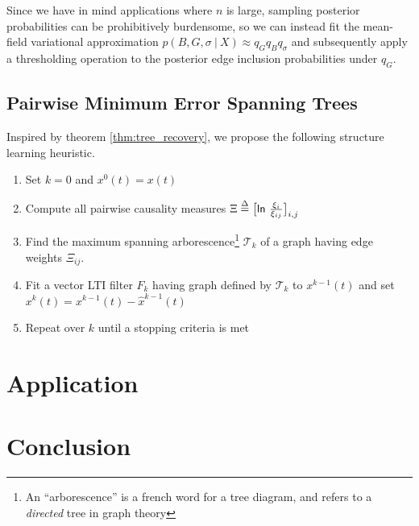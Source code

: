 \documentclass[12pt]{article}
\begin{document}
Since we have in mind applications where $n$ is large, sampling posterior probabilities can be prohibitively burdensome, so we can instead fit the mean-field variational approximation $p(B, G, \sigma\ |\ X) \approx q_Gq_Bq_\sigma$ and subsequently apply a thresholding operation to the posterior edge inclusion probabilities under $q_G$.

\subsection{Pairwise Minimum Error Spanning Trees}
Inspired by theorem \ref{thm:tree_recovery}, we propose the following
structure learning heuristic.


\begin{enumerate}
  \item{Set $k = 0$ and $x^0(t) = x(t)$}
  \item{Compute all pairwise causality measures $\Xi \overset{\Delta}{=} \big[\mathsf{ln\ } \frac{\xi_i}{\xi_{ij}} \big]_{i, j}$}
  \item{Find the maximum spanning arborescence\footnote{An ``arborescence'' is a french word for a tree diagram, and refers to a \textit{directed} tree in graph theory} $\mathcal{T}_k$ of a graph having edge weights $\Xi_{ij}$.}
  \item{Fit a vector LTI filter $F_k$ having graph defined by $\mathcal{T}_k$ to $x^{k - 1}(t)$ and set $x^k(t) = x^{k - 1}(t) - \hat{x}^{k - 1}(t)$}
  \item{Repeat over $k$ until a stopping criteria is met}
\end{enumerate}


\section{Application}
\section{Conclusion}

\printbibliography
\end{document}
